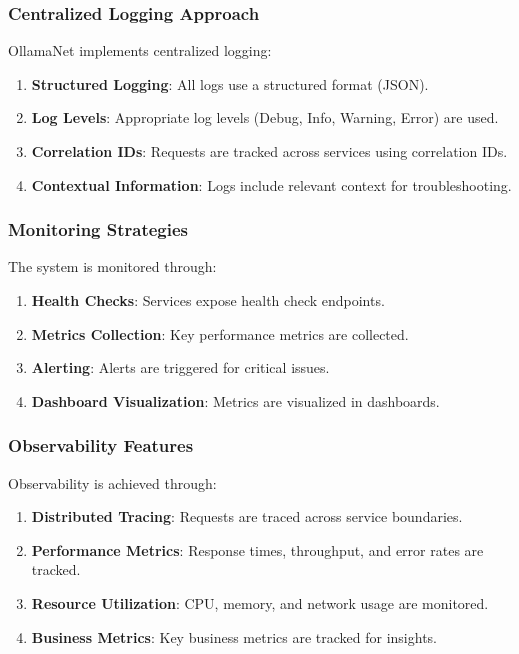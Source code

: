 \subsubsection{Centralized Logging Approach}

OllamaNet implements centralized logging:

\begin{enumerate}
   \item \textbf{Structured Logging}: All logs use a structured format (JSON).
   \item \textbf{Log Levels}: Appropriate log levels (Debug, Info, Warning, Error) are used.
   \item \textbf{Correlation IDs}: Requests are tracked across services using correlation IDs.
   \item \textbf{Contextual Information}: Logs include relevant context for troubleshooting.
\end{enumerate}

\subsubsection{Monitoring Strategies}

The system is monitored through:

\begin{enumerate}
   \item \textbf{Health Checks}: Services expose health check endpoints.
   \item \textbf{Metrics Collection}: Key performance metrics are collected.
   \item \textbf{Alerting}: Alerts are triggered for critical issues.
   \item \textbf{Dashboard Visualization}: Metrics are visualized in dashboards.
\end{enumerate}

\subsubsection{Observability Features}

Observability is achieved through:

\begin{enumerate}
   \item \textbf{Distributed Tracing}: Requests are traced across service boundaries.
   \item \textbf{Performance Metrics}: Response times, throughput, and error rates are tracked.
   \item \textbf{Resource Utilization}: CPU, memory, and network usage are monitored.
   \item \textbf{Business Metrics}: Key business metrics are tracked for insights.
\end{enumerate}

